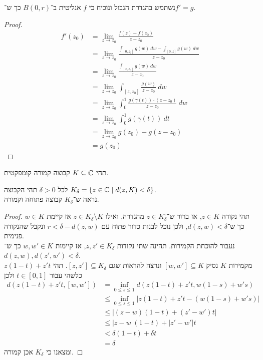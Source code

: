 \subquestion{}
נשתמש בהגדרת הגבול ונוכיח כי $f$ אנליטית ב־$B(0, r)$ כך ש־$f' = g$.
\begin{proof}
	\begin{align*}
		f'(z_0)
		& = \lim_{z \to z_0} \frac{f(z) - f(z_0)}{z - z_0} \\
		& = \lim_{z \to z_0} \frac{\int_{[0, z_0]} g(w)\ dw - \int_{[0, z]} g(w)\ dw}{z - z_0} \\
		& = \lim_{z \to z_0} \frac{\int_{[z, z_0]} g(w)\ dw}{z - z_0} \\
		& = \lim_{z \to z_0} \int_{[z, z_0]} \frac{g(w)}{z - z_0}\ dw \\
		& = \lim_{z \to z_0} \int_0^1 \frac{g(\gamma(t)) \cdot (z - z_0)}{z - z_0}\ dw \\
		& = \lim_{z \to z_0} \int_0^1 g(\gamma(t))\ dt \\
		& = \lim_{z \to z_0} g(z_0) - g(z - z_0) \\
		& = g(z_0)
	\end{align*}
\end{proof}

\question{}
תהי $K \subseteq \mathbb{C}$ קבוצה קמורה קומפקטית.

\subquestion{}
לכל $\delta > 0$ תהי הקבוצה $K_\delta = \{z \in \mathbb{C} \mid d(z, K) < \delta\}$. \\
נראה ש־$K_\delta$ קבוצה פתוחה וקמורה.
\begin{proof}
	תהי נקודה $z \in K$, אז ברור ש־$z \in K_\delta^\circ$ מהגדרה, ואילו $z \in K_\delta \setminus K$ אז קיימת $w \in K$ כך ש־$d(z, w) < \delta$, ולכן נוכל לבנות כדור פתוח עם $r < \delta - d(z, w)$ ונקבל שהנקודה פנימית. \\
	נעבור להוכחת הקמירות.
	תהינה שתי נקודות $z, z' \in K_\delta$, אז קיימות $w, w' \in K$ כך ש־$d(z, w), d(z', w') < \delta$. \\
	מקמירות $K$ נסיק $[w, w'] \subseteq K$ ונרצה להראות שגם $[z, z'] \subseteq K_\delta$.
	תהי $z (1 - t) + z' t$ כלשהי עבור $t \in [0, 1]$ ולכן
	\begin{align*}
		d(z (1 - t) + z' t, [w, w'])
		& = \inf_{0 \le s \le 1} d(z (1 - t) + z' t, w (1 - s) + w' s) \\
		& \le \inf_{0 \le s \le 1} |z (1 - t) + z' t - (w (1 - s) + w' s)| \\
		& \le |(z - w) (1 - t) + (z' - w') t| \\
		& \le |z - w| (1 - t) + |z' - w'| t \\
		& < \delta (1 - t) + \delta t \\
		& = \delta
	\end{align*}
	ומצאנו כי $K_\delta$ אכן קמורה.
\end{proof}

